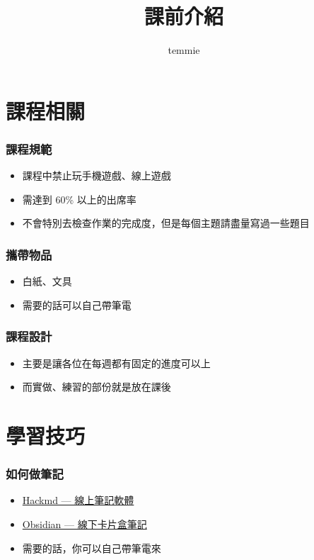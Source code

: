 \documentclass{beamer}
\title{課前介紹}
\author{temmie}
\date{}
\begin{document}
\begin{frame}
    \titlepage
\end{frame}

\begin{frame}
    \tableofcontents
\end{frame}

\section{課程相關}

\begin{frame}
    \frametitle{課程規範}
    \begin{itemize}
        \item 課程中禁止玩手機遊戲、線上遊戲
        \item 需達到 60\% 以上的出席率
        \item 不會特別去檢查作業的完成度，但是每個主題請盡量寫過一些題目
    \end{itemize}
\end{frame}

\begin{frame}
    \frametitle{攜帶物品}
    \begin{itemize}
        \item 白紙、文具
        \item 需要的話可以自己帶筆電
    \end{itemize}
\end{frame}

\begin{frame}
    \frametitle{課程設計}
    \begin{itemize}
        \item 主要是讓各位在每週都有固定的進度可以上
        \item 而實做、練習的部份就是放在課後
    \end{itemize}
\end{frame}

\section{學習技巧}

\begin{frame}
    \frametitle{如何做筆記}
    \begin{itemize}
        \item \href{https://hackmd.io/?nav=overview}{Hackmd — 線上筆記軟體}
        \item \href{https://youtu.be/Egj_DdGUIDI}{Obsidian — 線下卡片盒筆記}
        \vspace{0.5cm}
        \item 需要的話，你可以自己帶筆電來
    \end{itemize}
\end{frame}
\end{document}
